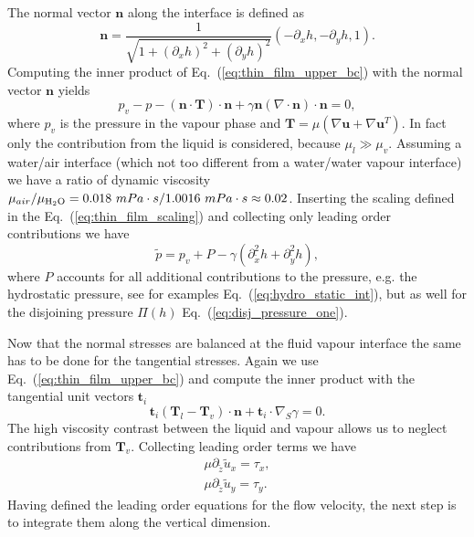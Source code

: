 The normal vector $\mathbf{n}$ along the interface is defined as 
\begin{equation}\label{eq:normal_vec_thin_film}
    \mathbf{n} = \frac{1}{\sqrt{1 + (\partial_x h)^2 + (\partial_y h)^2}}(-\partial_x h, -\partial_y h, 1).
\end{equation}
Computing the inner product of Eq.~(\ref{eq:thin_film_upper_bc}) with the normal vector $\mathbf{n}$ yields
\begin{equation}\label{eq:balance_stresses_normal}
    p_v - p -(\mathbf{n}\cdot\mathbf{T})\cdot\mathbf{n} + \gamma\mathbf{n}(\nabla\cdot\mathbf{n})\cdot\mathbf{n} = 0,
\end{equation}
where $p_v$ is the pressure in the vapour phase and $\mathbf{T} = \mu(\nabla\mathbf{u} + \nabla\mathbf{u}^T)$.
In fact only the contribution from the liquid is considered, because $\mu_l \gg \mu_v$.
Assuming a water/air interface (which not too different from a water/water vapour interface) we have a ratio of dynamic viscosity $\mu_{air} / \mu_{\ce{H2O}} = 0.018~mPa\cdot s/ 1.0016~mPa\cdot s \approx 0.02$.
Inserting the scaling defined in the Eq.~(\ref{eq:thin_film_scaling}) and collecting only leading order contributions we have 
\begin{equation}
    \tilde{p} = p_v + P - \gamma(\partial_{\tilde{x}}^2 h + \partial_{\tilde{y}}^2 h),
\end{equation}
where $P$ accounts for all additional contributions to the pressure, e.g. the hydrostatic pressure, see for examples Eq.~(\ref{eq:hydro_static_int}), but as well for the disjoining pressure $\Pi(h)$ Eq.~(\ref{eq:disj_pressure_one}).

Now that the normal stresses are balanced at the fluid vapour interface the same has to be done for the tangential stresses.
Again we use Eq.~(\ref{eq:thin_film_upper_bc}) and compute the inner product with the tangential unit vectors $\mathbf{t}_i$ 
\begin{equation}\label{eq:upper_bc_tangential}
    \mathbf{t}_i(\mathbf{T}_l - \mathbf{T}_v)\cdot\mathbf{n} + \mathbf{t}_i\cdot\nabla_S\gamma = 0.
\end{equation}
The high viscosity contrast between the liquid and vapour allows us to neglect contributions from $\mathbf{T}_v$.
Collecting leading order terms we have
\begin{align}
    \mu\partial_{\tilde{z}}\tilde{u}_x = \tau_x, \label{eq:tau_x_thin}\\
    \mu\partial_{\tilde{z}}\tilde{u}_y = \tau_y. \label{eq:tau_y_thin}
\end{align}
Having defined the leading order equations for the flow velocity, the next step is to integrate them along the vertical dimension.

